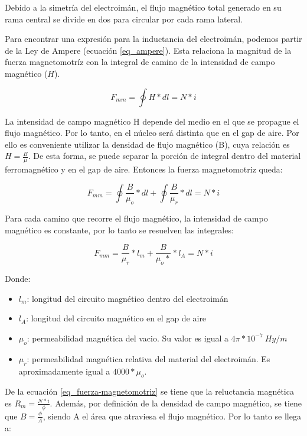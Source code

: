 \noindent Debido a la simetría del electroimán, el flujo magnético total generado en su rama central se divide en dos para circular por cada rama lateral.

\noindent Para encontrar una expresión para la inductancia del electroimán, podemos partir de la Ley de Ampere (ecuación \ref{eq_ampere}). Esta relaciona la magnitud de la fuerza magnetomotríz con la integral de camino de la intensidad de campo magnético ($H$).

\begin{equation} \label{eq_ampere}
	F_{mm}=\oint{H*dl}=N*i
\end{equation}

\noindent La intensidad de campo magnético H depende del medio en el que se propague el flujo magnético. Por lo tanto, en el núcleo será distinta que en el gap de aire. Por ello es conveniente utilizar la densidad de flujo magnético (B), cuya relación es $H=\frac{B}{\mu}$. De esta forma, se puede separar la porción de integral dentro del material ferromagnético y en el gap de aire. Entonces la fuerza magnetomotriz queda:

\begin{equation} 
	F_{mm}=\oint{\frac{B}{\mu_{o}}*dl}+\oint{\frac{B}{\mu_{r}}*dl}=N*i
\end{equation}

\noindent Para cada camino que recorre el flujo magnético, la intensidad de campo magnético es constante, por lo tanto se resuelven las integrales:

\begin{equation}
	F_{mm}=\frac{B}{\mu_{r}}*l_{m}+\frac{B}{\mu_{o}*}*l_{A}=N*i
\end{equation}

Donde:
\begin{itemize}
	\item $l_{m}$: longitud del circuito magnético dentro del electroimán
	\item $l_{A}$: longitud del circuito magnético en el gap de aire
	\item $\mu_{o}$: permeabilidad magnética del vacio. Su valor es igual a $4 \pi * 10^{-7}\:Hy/m$
	\item $\mu_{r}$: permeabilidad magnética relativa del material del electroimán. Es aproximadamente igual a $4000 * \mu_{o}$.

\end{itemize}

\noindent De la ecuación \ref{eq_fuerza-magnetomotriz} se tiene que la reluctancia magnética es $R_{m}=\frac{N*i}{\phi}$. Además, por definición de la densidad de campo magnético, se tiene que $B=\frac{\phi}{A}$, siendo A el área que atraviesa el flujo magnético. Por lo tanto se llega a:

